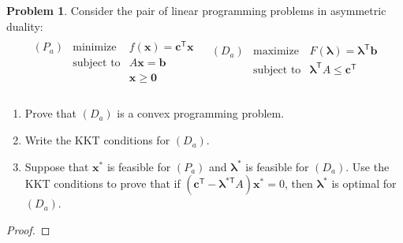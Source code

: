 \documentclass[12pt]{article}
\theoremstyle{definition}
\newtheorem{problem}{Problem}
\newcommand{\vc}[1]{\boldsymbol{#1}}
\newcommand{\tran}{\mathsf{T}}
\begin{document}
\begin{problem}
  Consider the pair of linear programming problems in asymmetric duality:
  \begin{align*}
    \begin{array}{ll}
      \begin{array}{rrl}
        (P_a) & \text{minimize} & f(\vc{x}) = \vc{c}^\tran\vc{x} \\
        & \text{subject to} & A\vc{x} = \vc{b} \\
        & & \vc{x} \geq \vc{0} \\
      \end{array}
      &
      \begin{array}{rrl}
        (D_a) & \text{maximize} & F(\vc{\lambda}) = \vc{\lambda}^\tran\vc{b} \\
        & \text{subject to} & \vc{\lambda}^\tran A \leq \vc{c}^\tran \\
        & & \\
      \end{array}
    \end{array}
  \end{align*}
  \begin{enumerate}
    \item Prove that $(D_a)$ is a convex programming problem.
    \item Write the KKT conditions for $(D_a)$.
    \item Suppose that $\vc{x}^*$ is feasible for $(P_a)$ and $\vc{\lambda}^*$ is
      feasible for $(D_a)$. Use the KKT conditions to prove that if $(\vc{c}^\tran - \vc{\lambda}^{*\tran}A)\vc{x}^* = 0$,
      then $\vc{\lambda}^*$ is optimal for $(D_a)$.
  \end{enumerate}
\end{problem}

\begin{proof}
\end{proof}
\end{document}
